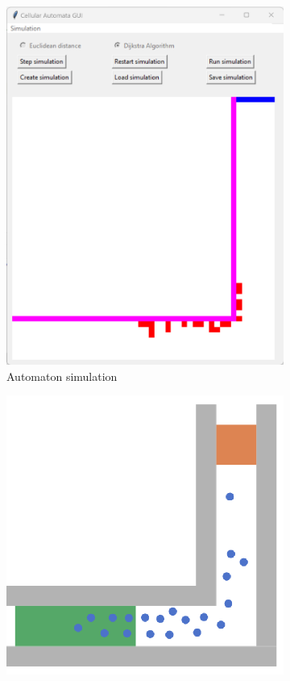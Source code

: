 \begin{figure}[H]
 \centering
 \begin{subfigure}[b]{0.3\textwidth}
     \centering
     \includegraphics[width=\textwidth]{images/1-rimea6b.png}
    \caption{Automaton simulation}
    \label{fig: rimea_6a}
 \end{subfigure}
 \begin{subfigure}[b]{0.3\textwidth}
      \centering
     \includegraphics[width=\textwidth]{images/RIMEA6_2.png}

\end{subfigure}
\end{figure}
